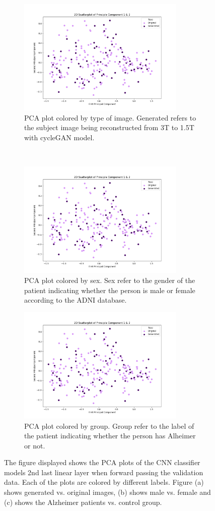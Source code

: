 \documentclass[12pt, fleqn, titlepage]{article}
\newcommand{\1}[1]{\mathds{1}\left[#1\right]}
\begin{document}
\begin{figure}[H]
	\centering
	\begin{subfigure}[t]{0.59\textwidth}
		\centering
		\includegraphics[height=2.2in]{imgs/classifier/with_generated_imgs_pca_type}%
		\caption{PCA plot colored by type of image. Generated refers to the subject image being reconstructed from 3T to 1.5T with cycleGAN model.}
	\end{subfigure}%
	~
	\begin{subfigure}[t]{0.5\textwidth}
		\centering
		\includegraphics[height=2.2in]{imgs/classifier/with_generated_imgs_pca_sex}%
		\caption{PCA plot colored by sex. Sex refer to the gender of the patient indicating whether the person is male or female according to the ADNI database.}	
	\end{subfigure}
	\begin{subfigure}[t]{0.5\textwidth}
		\centering
		\includegraphics[height=2.2in]{imgs/classifier/with_generated_imgs_pca_group}%
		\caption{PCA plot colored by group. Group refer to the label of the patient indicating whether the person has Alheimer or not.}
	\end{subfigure}

	\caption{The figure displayed shows the PCA plots of the CNN classifier models 2nd last linear layer when forward passing the validation data. Each of the plots are colored by different labels. Figure (a) shows generated vs. original images, (b) shows male vs. female and (c) shows the Alzheimer patients vs. control group. }
		\label{fig:pca_gen}
\end{figure}
\end{document}
